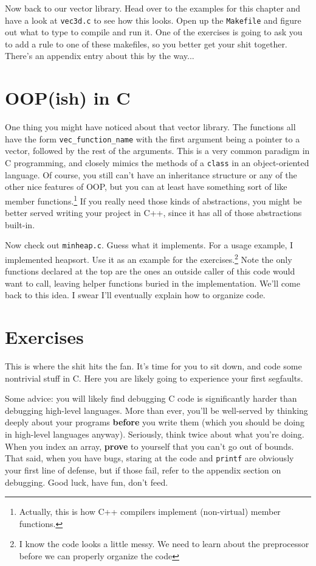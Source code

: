 \documentclass[ebook,11pt,oneside,openany]{memoir}
\newcommand{\cf}[1]{\texttt{#1}}
\begin{document}
Now back to our vector library. Head over to the examples for this chapter and have a look at \cf{vec3d.c} to see how this looks. Open up the \cf{Makefile} and figure out what to type to compile and run it. One of the exercises is going to ask you to add a rule to one of these makefiles, so you better get your shit together. There's an appendix entry about this by the way...

\section{OOP(ish) in C}

One thing you might have noticed about that vector library. The functions all have the form \cf{vec\_function\_name} with the first argument being a pointer to a vector, followed by the rest of the arguments. This is a very common paradigm in C programming, and closely mimics the methods of a \cf{class} in an object-oriented language. Of course, you still can't have an inheritance structure or any of the other nice features of OOP, but you can at least have something sort of like member functions.\footnote{Actually, this is how C++ compilers implement (non-virtual) member functions.} If you really need those kinds of abstractions, you might be better served writing your project in C++, since it has all of those abstractions built-in.

Now check out \cf{minheap.c}. Guess what it implements. For a usage example, I implemented heapsort. Use it as an example for the exercises.\footnote{I know the code looks a little messy. We need to learn about the preprocessor before we can properly organize the code} Note the only functions declared at the top are the ones an outside caller of this code would want to call, leaving helper functions buried in the implementation. We'll come back to this idea. I swear I'll eventually explain how to organize code.

\section{Exercises}

This is where the shit hits the fan. It's time for you to sit down, and code some nontrivial stuff in C. Here you are likely going to experience your first segfaults. 

Some advice: you will likely find debugging C code is significantly harder than debugging high-level languages. More than ever, you'll be well-served by thinking deeply about your programs \textbf{before} you write them (which you should be doing in high-level languages anyway). Seriously, think twice about what you're doing. When you index an array, \textbf{prove} to yourself that you can't go out of bounds. That said, when you have bugs, staring at the code and \cf{printf} are obviously your first line of defense, but if those fail, refer to the appendix section on debugging. Good luck, have fun, don't feed.
\end{document}
